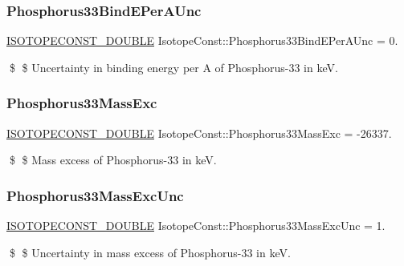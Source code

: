 \subsubsection{\texorpdfstring{Phosphorus33\+Bind\+E\+Per\+A\+Unc}{Phosphorus33BindEPerAUnc}}
{\footnotesize\ttfamily \mbox{\hyperlink{group___isotope_const-_macros_ga8f45a7272ce02c0b4c65c44636ed719a}{I\+S\+O\+T\+O\+P\+E\+C\+O\+N\+S\+T\+\_\+\+D\+O\+U\+B\+LE}} Isotope\+Const\+::\+Phosphorus33\+Bind\+E\+Per\+A\+Unc = 0.}

\$ \$ Uncertainty in binding energy per A of Phosphorus-\/33 in keV. \mbox{\label{group___isotope_const-_phosphorus-_p33_ga977c1a3cfb3a39ec88947308b7623d84}} 
\subsubsection{\texorpdfstring{Phosphorus33\+Mass\+Exc}{Phosphorus33MassExc}}
{\footnotesize\ttfamily \mbox{\hyperlink{group___isotope_const-_macros_ga8f45a7272ce02c0b4c65c44636ed719a}{I\+S\+O\+T\+O\+P\+E\+C\+O\+N\+S\+T\+\_\+\+D\+O\+U\+B\+LE}} Isotope\+Const\+::\+Phosphorus33\+Mass\+Exc = -\/26337.}

\$ \$ Mass excess of Phosphorus-\/33 in keV. \mbox{\label{group___isotope_const-_phosphorus-_p33_ga0d8caafe2ee008c70650f75a2a199a89}} 
\subsubsection{\texorpdfstring{Phosphorus33\+Mass\+Exc\+Unc}{Phosphorus33MassExcUnc}}
{\footnotesize\ttfamily \mbox{\hyperlink{group___isotope_const-_macros_ga8f45a7272ce02c0b4c65c44636ed719a}{I\+S\+O\+T\+O\+P\+E\+C\+O\+N\+S\+T\+\_\+\+D\+O\+U\+B\+LE}} Isotope\+Const\+::\+Phosphorus33\+Mass\+Exc\+Unc = 1.}

\$ \$ Uncertainty in mass excess of Phosphorus-\/33 in keV. \mbox{\label{group___isotope_const-_phosphorus-_p33_gaf70662b1bcbd3ec59fe99098b2f6c300}} 
